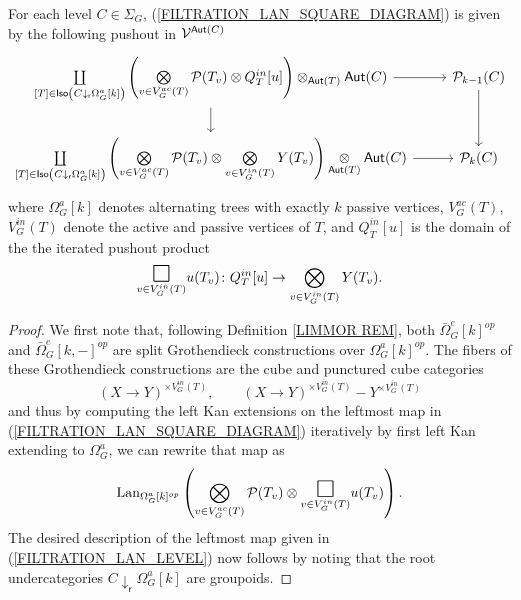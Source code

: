 \documentclass[a4paper,10pt]{article}%
\begin{document}
\begin{proposition}
  For each level $C\in \Sigma_G$,
  (\ref{FILTRATION_LAN_SQUARE_DIAGRAM})
  is given by the following pushout in $\mathcal V^{\mathsf{Aut}(C)}$
  \begin{equation}\label{FILTRATION_LAN_LEVEL}
    \begin{tikzcd}
      \coprod\limits_{[T] \in \mathsf{Iso}
        \left(C \downarrow_{\mathsf{r}} \Omega_G^a[k]\right)}
      \left(
        \bigotimes\limits_{v \in V_{G}^{ac}(T)}\P(T_v) \otimes
        Q_T^{in}[u]
      \right)
      \otimes_{\mathsf{Aut}(T)} \mathsf{Aut}(C)
      \arrow[r] \arrow[d] &
      \P_{k-1}(C) \arrow[d] 
      \\
      \coprod\limits_{[T] \in \mathsf{Iso}
        \left(C \downarrow_{\mathsf{r}} \Omega_G^a[k]\right)}
      \left(
        \bigotimes\limits_{v \in V_{G}^{ac}(T)}\P(T_v) \otimes
        \bigotimes\limits_{v \in V_{G}^{in}(T)} Y(T_v)
      \right)
      \underset{\mathsf{Aut}(T)}{\otimes} \mathsf{Aut}(C)
      \arrow[r] &
      \P_k(C)
    \end{tikzcd}
  \end{equation}
  where $\Omega_G^a[k]$ denotes alternating trees with exactly $k$ 
  passive vertices, $ V_{G}^{ac}(T)$, $V_{G}^{in}(T)$ denote the active and passive vertices of $T$,
  and $Q_T^{in}[u]$ is the domain 
  of the the iterated pushout product
  \[
  \underset{v \in V_G^{in}(T)}
  {\mathlarger{\mathlarger{\mathlarger{\square}}}}u(T_v)
  \colon
  Q_T^{in}[u] \to
  \bigotimes\limits_{v \in V_{G}^{in}(T)} Y(T_v).
  \]
\end{proposition}


\begin{proof}
  We first note that, following 
  Definition \ref{LIMMOR REM}, both 
  $\bar{\Omega}_{G}^e[k]^{op}$ and $\bar{\Omega}_{G}^e[k,-]^{op}$
  are split Grothendieck constructions over
  $\Omega_G^a[k]^{op}$.
  The fibers of these Grothendieck constructions
  are the cube and punctured cube categories
  \[
  (X \to Y)^{\times V_G^{in}(T)},
  \qquad
  (X \to Y)^{\times V_G^{in}(T)} - Y^{\times V_G^{in}(T)}
  \]
  and thus by computing the left Kan extensions on the leftmost map in (\ref{FILTRATION_LAN_SQUARE_DIAGRAM}) iteratively by first left Kan extending to $\Omega_G^a$, we can rewrite that map as
  \[
  \Lan_{\Omega_G^a[k]^{op}}
  \left(
    \bigotimes\limits_{v \in V_{G}^{ac}(T)}\P(T_v) \otimes
    \underset{v \in V_{G}^{in}(T)}
    {\mathlarger{\mathlarger{\mathlarger{\square}}}}
    u(T_v)
  \right).
  \]
  The desired description of the leftmost map given in (\ref{FILTRATION_LAN_LEVEL})
  now follows by noting that the root undercategories
  $C \downarrow_{\mathsf{r}} \Omega_G^a[k]$
  are groupoids.
\end{proof}
\end{document}

